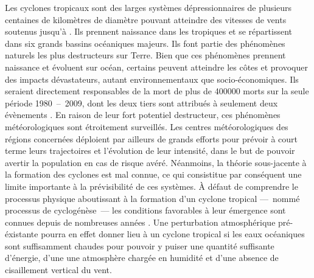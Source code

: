 \documentclass[../main.tex]{subfiles}
\begin{document}
Les cyclones tropicaux sont des larges systèmes dépressionnaires de plusieurs centaines de kilomètres de diamètre pouvant atteindre des vitesses de vents
soutenus jusqu'à . Ils prennent naissance dans les tropiques et se répartissent dans six grands bassins océaniques majeurs. Ils font partie des
phénomènes naturels les plus destructeurs sur Terre. Bien que ces phénomènes prennent naissance et évoluent sur océan, certains peuvent atteindre les côtes et
provoquer des impacts dévastateurs, autant environnementaux que socio-économiques. Ils seraient directement responsables de la mort de plus de \num{400000}
morts sur la seule période \num{1980}~--~\num{2009}, dont les deux tiers sont attribués à seulement deux évènements \parencite{doocy_human_2013}. En raison de
leur fort potentiel destructeur, ces phénomènes météorologiques sont étroitement surveillés. Les centres météorologiques des régions concernées déploient par
ailleurs de grands efforts pour prévoir à court terme leurs trajectoires et l'évolution de leur intensité, dans le but de pouvoir avertir la population en cas
de risque avéré. Néanmoins, la théorie sous-jacente à la formation des cyclones est mal connue, ce qui consistitue par conséquent une limite importante à la
prévisibilité de ces systèmes. À défaut de comprendre le processus physique aboutissant à la formation d'un cyclone tropical ---~nommé processus de
cyclogénèse~--- les conditions favorables à leur émergence sont connues depuis de nombreuses années \parencite{gray_tropical_1975}. Une perturbation
atmosphérique pré-éxistante pourra en effet donner lieu à un cyclone tropical si les eaux océaniques sont suffisamment chaudes pour pouvoir y puiser une
quantité suffisante d'énergie, d'une une atmosphère chargée en humidité et d'une absence de cisaillement vertical du vent.
\end{document}
